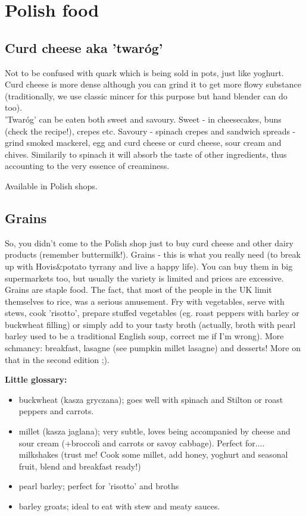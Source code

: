 \section*{Polish food}

\subsection*{Curd cheese aka 'twaróg'}

Not to be confused with quark which is being sold in pots, just like yoghurt.\\
Curd cheese is more dense although you can grind it to get more flowy substance (traditionally, we use classic mincer for this purpose but hand blender can do too).\\
'Twaróg' can be eaten both sweet and savoury. Sweet - in cheesecakes, buns (check the recipe!), crepes etc. Savoury - spinach crepes and sandwich spreads - grind smoked mackerel, egg and curd cheese or curd cheese, sour cream and chives.
Similarily to spinach it will absorb the taste of other ingredients, thus accounting to the very essence of creaminess.

Available in Polish shops.

\subsection*{Grains}
So, you didn't come to the Polish shop just to buy curd cheese and other dairy products (remember buttermilk!).
Grains - this is what you really need (to break up with Hovis\&potato tyrrany and live a happy life).
You can buy them in big supermarkets too, but usually the variety is limited and prices are excessive.\\
Grains are staple food. The fact, that most of the people in the UK limit themselves to rice, was a serious amusement. Fry with vegetables, serve with stews, cook 'risotto', prepare stuffed vegetables (eg. roast peppers with barley or buckwheat filling) or simply add to your tasty broth (actually, broth with pearl barley used to be a traditional English soup, correct me if I'm wrong). More schmancy: breakfast, lasagne (see pumpkin millet lasagne) and desserts! More on that in the second edition ;).

\textbf{Little glossary:}
\begin{itemize}
    \setlength\itemsep{0.1mm}
    \item buckwheat (kasza gryczana); goes well with spinach and Stilton or roast peppers and carrots. 
    \item millet (kasza jaglana); very subtle, loves being accompanied by cheese and sour cream (+broccoli and carrots or savoy cabbage). Perfect for.... milkshakes (trust me! Cook some millet, add honey, yoghurt and seasonal fruit, blend and breakfast ready!) 
    \item pearl barley; perfect for 'risotto' and broths
    \item barley groats; ideal to eat with stew and meaty sauces. 
\end{itemize}

